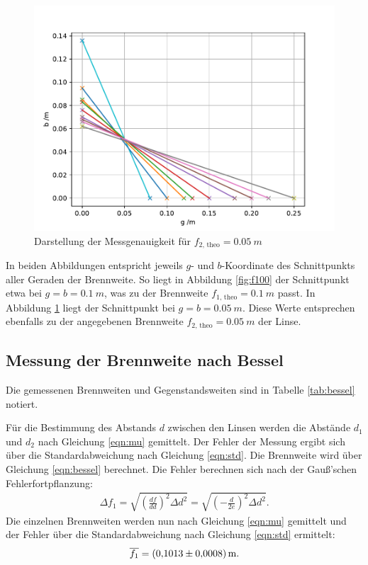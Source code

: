 \begin{figure}[h!]
  \centering
  \includegraphics[width=\textwidth]{f50.pdf}
  \caption{Darstellung der Messgenauigkeit für $f_{\text{2, theo}}=\SI{0.05}{m}$}
  \label{fig:f50}
\end{figure}
In beiden Abbildungen entspricht jeweils $g$- und $b$-Koordinate des Schnittpunkts aller Geraden der Brennweite.
So liegt in Abbildung \ref{fig:f100} der Schnittpunkt etwa bei $g=b=\SI{0.1}{m}$, was zu der Brennweite $f_{\text{1, theo}}=\SI{0.1}{m}$ passt.
In Abbildung \ref{fig:f50} liegt der Schnittpunkt bei $g=b=\SI{0.05}{m}$.
Diese Werte entsprechen ebenfalls zu der angegebenen Brennweite $f_{\text{2, theo}}=\SI{0.05}{m}$ der Linse.
\FloatBarrier

\subsection{Messung der Brennweite nach Bessel}
\label{kap:bessel}
Die gemessenen Brennweiten und Gegenstandsweiten sind in Tabelle \ref{tab:bessel} notiert.

Für die Bestimmung des Abstands $d$ zwischen den Linsen werden die Abstände $d_{1}$ und $d_{2}$ nach Gleichung \eqref{eqn:mu} gemittelt.
Der Fehler der Messung ergibt sich über die Standardabweichung nach Gleichung \eqref{eqn:std}.
Die Brennweite wird über Gleichung \eqref{eqn:bessel} berechnet.
Die Fehler berechnen sich nach der Gauß'schen Fehlerfortpflanzung:
\begin{align*}
  \Delta f_{1}= \sqrt{ \left( \frac{df}{d d} \right)^2 \Delta d^2 }= \sqrt{ \left( -\frac{d}{2e}\right)^2 \Delta d^2}.
\end{align*}
Die einzelnen Brennweiten werden nun nach Gleichung \eqref{eqn:mu} gemittelt und der Fehler über die Standardabweichung nach Gleichung \eqref{eqn:std} ermittelt:
\begin{align*}
  \overline{f_{1}}= \SI{0.1013 \pm 0.0008}{m}.
\end{align*}
\FloatBarrier

